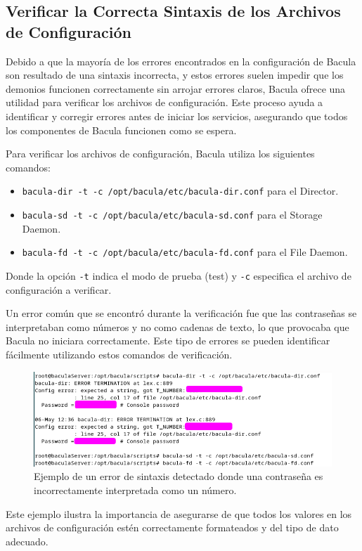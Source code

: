 \subsection{Verificar la Correcta Sintaxis de los Archivos de Configuración}

Debido a que la mayoría de los errores encontrados en la configuración de Bacula son resultado de una sintaxis incorrecta, y estos errores suelen impedir que los demonios funcionen correctamente sin arrojar errores claros, Bacula ofrece una utilidad para verificar los archivos de configuración. Este proceso ayuda a identificar y corregir errores antes de iniciar los servicios, asegurando que todos los componentes de Bacula funcionen como se espera.

Para verificar los archivos de configuración, Bacula utiliza los siguientes comandos:
\begin{itemize}
    \item \texttt{bacula-dir -t -c /opt/bacula/etc/bacula-dir.conf} para el Director.
    \item \texttt{bacula-sd -t -c /opt/bacula/etc/bacula-sd.conf} para el Storage Daemon.
    \item \texttt{bacula-fd -t -c /opt/bacula/etc/bacula-fd.conf} para el File Daemon.
\end{itemize}

Donde la opción \texttt{-t} indica el modo de prueba (test) y \texttt{-c} especifica el archivo de configuración a verificar.

Un error común que se encontró durante la verificación fue que las contraseñas se interpretaban como números y no como cadenas de texto, lo que provocaba que Bacula no iniciara correctamente. Este tipo de errores se pueden identificar fácilmente utilizando estos comandos de verificación.

\begin{figure}[H]
    \centering
    \includegraphics[width=0.5\linewidth]{instalacionBacula/verificacionSintaxsis.png}
    \caption{Ejemplo de un error de sintaxis detectado donde una contraseña es incorrectamente interpretada como un número.}
\end{figure}

Este ejemplo ilustra la importancia de asegurarse de que todos los valores en los archivos de configuración estén correctamente formateados y del tipo de dato adecuado.
